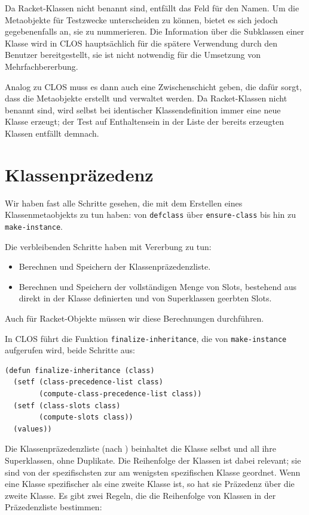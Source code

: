 Da Racket-Klassen nicht benannt sind, entfällt das Feld für den Namen. Um die Metaobjekte für Testzwecke unterscheiden zu können, bietet es sich jedoch gegebenenfalls an, sie zu nummerieren. Die Information über die Subklassen einer Klasse wird in CLOS hauptsächlich für die spätere Verwendung durch den Benutzer bereitgestellt, sie ist nicht notwendig für die Umsetzung von Mehrfachbererbung. 

Analog zu CLOS muss es dann auch eine Zwischenschicht geben, die dafür sorgt, dass die Metaobjekte erstellt und verwaltet werden. Da Racket-Klassen nicht benannt sind, wird selbst bei identischer Klassendefinition immer eine neue Klasse erzeugt; der Test auf Enthaltensein in der Liste der bereits erzeugten Klassen entfällt demnach.

\section{Klassenpräzedenz}
\label{cpl}
Wir haben fast alle Schritte gesehen, die mit dem Erstellen eines Klassenmetaobjekts zu tun haben: von \texttt{defclass} über \texttt{ensure-class} bis hin zu \texttt{make-instance}. 

Die verbleibenden Schritte haben mit Vererbung zu tun:
\begin{itemize}
 \item Berechnen und Speichern der Klassenpräzedenzliste.
 \item Berechnen und Speichern der vollständigen Menge von Slots, bestehend aus direkt in der Klasse definierten und von Superklassen geerbten Slots.
\end{itemize}

Auch für Racket-Objekte müssen wir diese Berechnungen durchführen.

In CLOS führt die Funktion \texttt{finalize-inheritance}, die von \texttt{make-instance} aufgerufen wird, beide Schritte aus:

\begin{lstlisting}
(defun finalize-inheritance (class)
  (setf (class-precedence-list class)
        (compute-class-precedence-list class))
  (setf (class-slots class)
        (compute-slots class))
  (values))
\end{lstlisting}

Die Klassenpräzedenzliste (nach \cite[S. 118ff]{keene}) beinhaltet die Klasse selbst und all ihre Superklassen, ohne Duplikate. Die Reihenfolge der Klassen ist dabei relevant; sie sind von der spezifischsten zur am wenigsten spezifischen Klasse geordnet. Wenn eine Klasse spezifischer als eine zweite Klasse ist, so hat sie Präzedenz über die zweite Klasse. Es gibt zwei Regeln, die die Reihenfolge von Klassen in der Präzedenzliste bestimmen:

